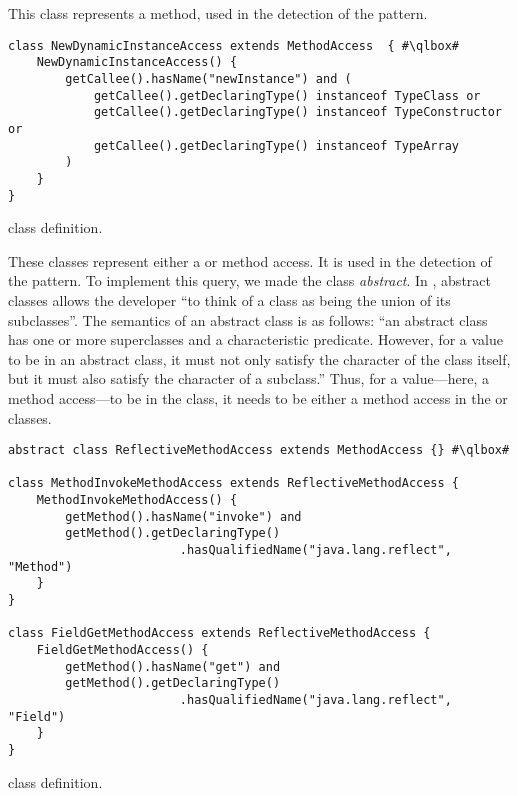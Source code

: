 This class represents a  method,
used in the detection of the  pattern.

\begin{listing}
\begin{verbatim}
class NewDynamicInstanceAccess extends MethodAccess  { #\qlbox#
	NewDynamicInstanceAccess() {
		getCallee().hasName("newInstance") and (
			getCallee().getDeclaringType() instanceof TypeClass or
			getCallee().getDeclaringType() instanceof TypeConstructor or
			getCallee().getDeclaringType() instanceof TypeArray
		)
	}
}
\end{verbatim}
\caption{ class definition.}
\label{lst:ql:NewDynamicInstanceAccess}
\end{listing}


These classes represent either a  or  method access.
It is used in the detection of the  pattern.
To implement this query, we made the  class 
\emph{abstract}.
In \ql{}, abstract classes allows the developer 
``to think of a class as being the union of its subclasses''.%
The semantics of an abstract class is as follows:
``an abstract class has one or more superclasses and a characteristic predicate.
However, for a value to be in an abstract class,
it must not only satisfy the character of the class itself,
but it must also satisfy the character of a subclass.''
Thus,
for a value---here, a method access---to be in the  class,
it needs to be either a method access in the  or  classes.

\begin{listing}
\begin{verbatim}
abstract class ReflectiveMethodAccess extends MethodAccess {} #\qlbox#

class MethodInvokeMethodAccess extends ReflectiveMethodAccess {
	MethodInvokeMethodAccess() {
		getMethod().hasName("invoke") and
		getMethod().getDeclaringType()
						.hasQualifiedName("java.lang.reflect", "Method")
	}
}

class FieldGetMethodAccess extends ReflectiveMethodAccess {
	FieldGetMethodAccess() {
		getMethod().hasName("get") and
		getMethod().getDeclaringType()
						.hasQualifiedName("java.lang.reflect", "Field")
	}
}
\end{verbatim}
\caption{ class definition.}
\label{lst:ql:ReflectiveMethodAccess}
\end{listing}

